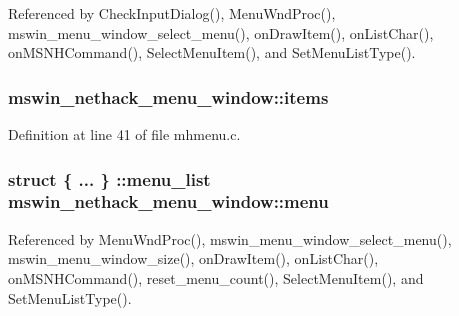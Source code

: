 Referenced by Check\+Input\+Dialog(), Menu\+Wnd\+Proc(), mswin\+\_\+menu\+\_\+window\+\_\+select\+\_\+menu(), on\+Draw\+Item(), on\+List\+Char(), on\+M\+S\+N\+H\+Command(), Select\+Menu\+Item(), and Set\+Menu\+List\+Type().

\hypertarget{structmswin__nethack__menu__window_a4fa6602eb4a3e8e22b7d2248e49c35c4}{
\subsubsection[{items}]{ mswin\+\_\+nethack\+\_\+menu\+\_\+window\+::items}}\label{structmswin__nethack__menu__window_a4fa6602eb4a3e8e22b7d2248e49c35c4}


Definition at line 41 of file mhmenu.\+c.

\hypertarget{structmswin__nethack__menu__window_a8da0ac3642664655477707181c2b4284}{
\subsubsection[{menu}]{\setlength{\rightskip}{0pt plus 5cm}struct \{ ... \} \+::menu\+\_\+list  mswin\+\_\+nethack\+\_\+menu\+\_\+window\+::menu}}\label{structmswin__nethack__menu__window_a8da0ac3642664655477707181c2b4284}


Referenced by Menu\+Wnd\+Proc(), mswin\+\_\+menu\+\_\+window\+\_\+select\+\_\+menu(), mswin\+\_\+menu\+\_\+window\+\_\+size(), on\+Draw\+Item(), on\+List\+Char(), on\+M\+S\+N\+H\+Command(), reset\+\_\+menu\+\_\+count(), Select\+Menu\+Item(), and Set\+Menu\+List\+Type().

